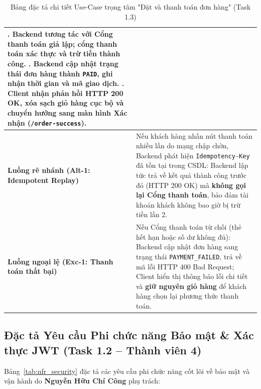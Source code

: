\documentclass[a4paper]{article}
\begin{document}
\begin{table}[H]
\begin{tabular}{|>{\raggedright\arraybackslash}p{3.4cm}|>{\raggedright\arraybackslash}p{12.2cm}|}
8. Backend tương tác với Cổng thanh toán giả lập; cổng thanh toán xác thực và trừ tiền thành công. \newline
9. Backend cập nhật trạng thái đơn hàng thành \texttt{PAID}, ghi nhận thời gian và mã giao dịch. \newline
10. Client nhận phản hồi HTTP 200 OK, xóa sạch giỏ hàng cục bộ và chuyển hướng sang màn hình Xác nhận (\texttt{/order-success}). \\ \hline
\textbf{Luồng rẽ nhánh (Alt-1: Idempotent Replay)} & 
Nếu khách hàng nhấn nút thanh toán nhiều lần do mạng chập chờn, Backend phát hiện \texttt{Idempotency-Key} đã tồn tại trong CSDL: Backend lập tức trả về kết quả thành công trước đó (HTTP 200 OK) mà \textbf{không gọi lại Cổng thanh toán}, bảo đảm tài khoản khách không bao giờ bị trừ tiền lần 2. \\ \hline
\textbf{Luồng ngoại lệ (Exc-1: Thanh toán thất bại)} & 
Nếu Cổng thanh toán từ chối (thẻ hết hạn hoặc số dư không đủ): Backend cập nhật đơn hàng sang trạng thái \texttt{PAYMENT\_FAILED}, trả về mã lỗi HTTP 400 Bad Request; Client hiển thị thông báo lỗi chi tiết và \textbf{giữ nguyên giỏ hàng} để khách hàng chọn lại phương thức thanh toán. \\ \hline
\end{tabular}
\caption{Bảng đặc tả chi tiết Use-Case trọng tâm "Đặt và thanh toán đơn hàng" (Task 1.3)}
\label{tab:usecase_detail}
\end{table}

\newpage
\subsection{Đặc tả Yêu cầu Phi chức năng Bảo mật \& Xác thực JWT (Task 1.2 -- Thành viên 4)}
Bảng~\ref{tab:nfr_security} đặc tả các yêu cầu phi chức năng cốt lõi về bảo mật và vận hành do \textbf{Nguyễn Hữu Chí Công} phụ trách:
\end{document}
